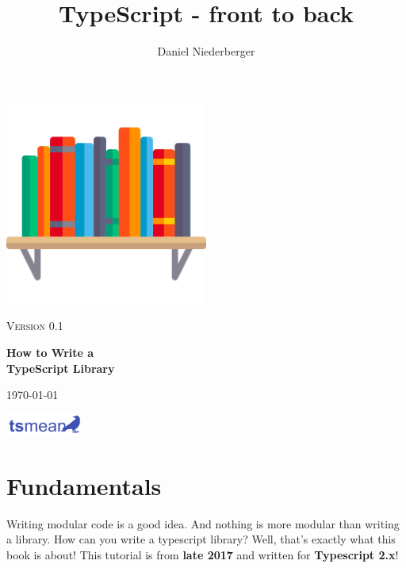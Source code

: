 \documentclass[12pt,a4paper]{article}
\title{TypeScript - front to back}
\author{Daniel Niederberger}
\begin{document}
\begin{titlepage}
	\centering
	\includegraphics[width=0.5\textwidth]{figures/001-bookshelf.png}\par
	{\scshape\Large Version 0.1\par}
	\vspace{1.5cm}
	{\huge\bfseries How to Write a\\ TypeScript Library\par}



	\vfill

	{\large \today\par}
	\vspace{0.5cm}
\includegraphics[width=2.5cm]{figures/tsmean-logo.pdf}

\end{titlepage}

\tableofcontents
\newpage

\section{Fundamentals}

Writing modular code is a good idea. And nothing is more modular than
writing a library. How can you write a typescript library? Well, that's
exactly what this book is about! This tutorial is from \textbf{late
2017} and written for \textbf{Typescript 2.x}!
\end{document}
